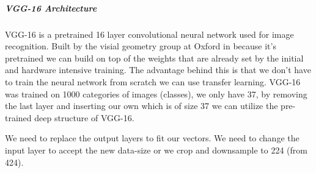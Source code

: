 \subparagraph{VGG-16 Architecture}
VGG-16 is a pretrained 16 layer convolutional neural network used for image recognition. Built by the visial geometry group at Oxford in \citeyear{vgg16-arxiv} \cite{vgg16-arxiv} because it's pretrained we can build on top of the weights that are already set by the initial and hardware intensive training. The advantage behind this is that we don't have to train the neural network from scratch we can use transfer learning. VGG-16 was trained on 1000 categories of images (classes), we only have 37, by removing the last layer and inserting our own which is of size 37 we can utilize the pre-trained deep structure of VGG-16.


We need to replace the output layers to fit our vectors.
We need to change the input layer to accept the new data-size or we crop and downsample to 224 (from 424).
